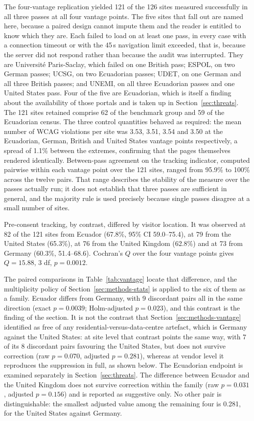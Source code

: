 \documentclass[]{interact}
\begin{document}
The four-vantage replication yielded 121 of the 126 sites measured successfully in all three passes at all four vantage points. The five sites that fall out are named here, because a paired design cannot impute them and the reader is entitled to know which they are. Each failed to load on at least one pass, in every case with a connection timeout or with the 45\,s navigation limit exceeded, that is, because the server did not respond rather than because the audit was interrupted. They are Universit\'e Paris-Saclay, which failed on one British pass; ESPOL, on two German passes; UCSG, on two Ecuadorian passes; UDET, on one German and all three British passes; and UNEMI, on all three Ecuadorian passes and one United States pass. Four of the five are Ecuadorian, which is itself a finding about the availability of those portals and is taken up in Section~\ref{sec:threats}. The 121 sites retained comprise 62 of the benchmark group and 59 of the Ecuadorian census. The three control quantities behaved as required: the mean number of WCAG violations per site was 3.53, 3.51, 3.54 and 3.50 at the Ecuadorian, German, British and United States vantage points respectively, a spread of 1.1\% between the extremes, confirming that the pages themselves rendered identically. Between-pass agreement on the tracking indicator, computed pairwise within each vantage point over the 121 sites, ranged from 95.9\% to 100\% across the twelve pairs. That range describes the stability of the measure over the passes actually run; it does not establish that three passes are sufficient in general, and the majority rule is used precisely because single passes disagree at a small number of sites.

Pre-consent tracking, by contrast, differed by visitor location. It was observed at 82 of the 121 sites from Ecuador (67.8\%, 95\% CI 59.0--75.4), at 79 from the United States (65.3\%), at 76 from the United Kingdom (62.8\%) and at 73 from Germany (60.3\%, 51.4--68.6). Cochran's $Q$ over the four vantage points gives $Q=15.88$, 3 df, $p=0.0012$.

The paired comparisons in Table~\ref{tab:vantage} locate that difference, and the multiplicity policy of Section~\ref{sec:methods-stats} is applied to the six of them as a family. Ecuador differs from Germany, with 9 discordant pairs all in the same direction (exact $p=0.0039$; Holm-adjusted $p=0.023$), and this contrast is the finding of the section. It is not the contrast that Section~\ref{sec:methods-vantage} identified as free of any residential-versus-data-centre artefact, which is Germany against the United States: at site level that contrast points the same way, with 7 of its 8 discordant pairs favouring the United States, but does not survive correction (raw $p=0.070$, adjusted $p=0.281$), whereas at vendor level it reproduces the suppression in full, as shown below. The Ecuadorian endpoint is examined separately in Section~\ref{sec:threats}. The difference between Ecuador and the United Kingdom does not survive correction within the family (raw $p=0.031$, adjusted $p=0.156$) and is reported as suggestive only. No other pair is distinguishable: the smallest adjusted value among the remaining four is 0.281, for the United States against Germany.
\end{document}
